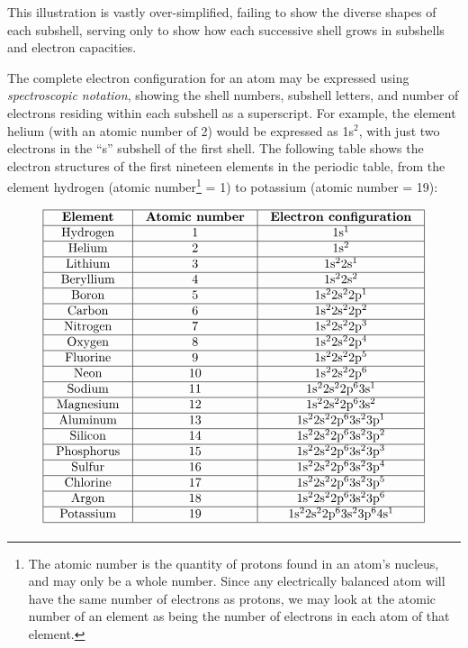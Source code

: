 This illustration is vastly over-simplified, failing to show the diverse shapes of each subshell, serving only to show how each successive shell grows in subshells and electron capacities.

\filbreak

The complete electron configuration for an atom may be expressed using \textit{spectroscopic notation}, showing the shell numbers, subshell letters, and number of electrons residing within each subshell as a superscript.  For example, the element helium (with an atomic number of 2) would be expressed as 1s$^{2}$, with just two electrons in the ``s'' subshell of the first shell.  The following table shows the electron structures of the first nineteen elements in the periodic table, from the element hydrogen (atomic number\footnote{The atomic number is the quantity of protons found in an atom's nucleus, and may only be a whole number.  Since any electrically balanced atom will have the same number of electrons as protons, we may look at the atomic number of an element as being the number of electrons in each atom of that element.} = 1) to potassium (atomic number = 19):  


$$\vbox{\offinterlineskip
\halign{\strut
\vrule \quad\hfil # \ \hfil & 
\vrule \quad\hfil # \ \hfil & 
\vrule \quad\hfil # \ \hfil \vrule \cr
\noalign{\hrule}
%
\textbf{Element} & \textbf{Atomic number} & \textbf{Electron configuration} \cr
%
\noalign{\hrule}
%
Hydrogen & 1 & 1s$^{1}$ \cr
%
\noalign{\hrule}
%
Helium & 2 & 1s$^{2}$ \cr
%
\noalign{\hrule}
%
Lithium & 3 & 1s$^{2}$2s$^{1}$ \cr
%
\noalign{\hrule}
%
Beryllium & 4 & 1s$^{2}$2s$^{2}$ \cr
%
\noalign{\hrule}
%
Boron & 5 & 1s$^{2}$2s$^{2}$2p$^{1}$ \cr
%
\noalign{\hrule}
%
Carbon & 6 & 1s$^{2}$2s$^{2}$2p$^{2}$ \cr
%
\noalign{\hrule}
%
Nitrogen & 7 & 1s$^{2}$2s$^{2}$2p$^{3}$ \cr
%
\noalign{\hrule}
%
Oxygen & 8 & 1s$^{2}$2s$^{2}$2p$^{4}$ \cr
%
\noalign{\hrule}
%
Fluorine & 9 & 1s$^{2}$2s$^{2}$2p$^{5}$ \cr
%
\noalign{\hrule}
%
Neon & 10 & 1s$^{2}$2s$^{2}$2p$^{6}$ \cr
%
\noalign{\hrule}
%
Sodium & 11 & 1s$^{2}$2s$^{2}$2p$^{6}$3s$^{1}$ \cr
%
\noalign{\hrule}
%
Magnesium & 12 & 1s$^{2}$2s$^{2}$2p$^{6}$3s$^{2}$ \cr
%
\noalign{\hrule}
%
Aluminum & 13 & 1s$^{2}$2s$^{2}$2p$^{6}$3s$^{2}$3p$^{1}$ \cr
%
\noalign{\hrule}
%
Silicon & 14 & 1s$^{2}$2s$^{2}$2p$^{6}$3s$^{2}$3p$^{2}$ \cr
%
\noalign{\hrule}
%
Phosphorus & 15 & 1s$^{2}$2s$^{2}$2p$^{6}$3s$^{2}$3p$^{3}$ \cr
%
\noalign{\hrule}
%
Sulfur & 16 & 1s$^{2}$2s$^{2}$2p$^{6}$3s$^{2}$3p$^{4}$ \cr
%
\noalign{\hrule}
%
Chlorine & 17 & 1s$^{2}$2s$^{2}$2p$^{6}$3s$^{2}$3p$^{5}$ \cr
%
\noalign{\hrule}
%
Argon & 18 & 1s$^{2}$2s$^{2}$2p$^{6}$3s$^{2}$3p$^{6}$ \cr
%
\noalign{\hrule}
%
Potassium & 19 & 1s$^{2}$2s$^{2}$2p$^{6}$3s$^{2}$3p$^{6}$4s$^{1}$ \cr
%
\noalign{\hrule}
} %
}$$ %

